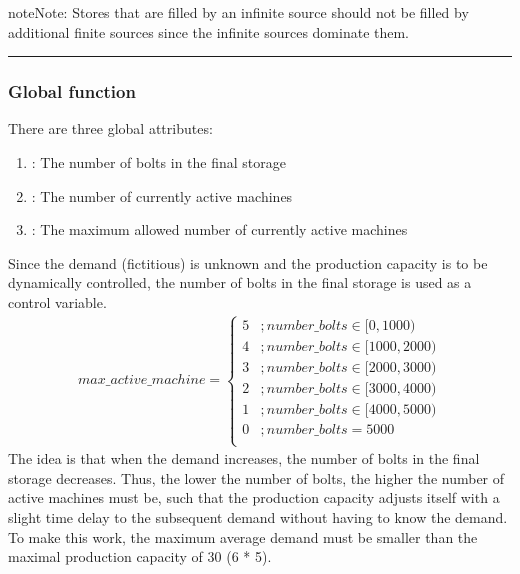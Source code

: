 \documentclass[letterpaper,10pt,english]{sphinxmanual}
\begin{document}
\begin{sphinxadmonition}{note}{Note:}
\sphinxAtStartPar
Stores that are filled by an infinite source should not be filled by additional finite sources since the infinite
sources dominate them.
\end{sphinxadmonition}


\bigskip\hrule\bigskip



\subsubsection{Global function}
\label{\detokenize{source/Examples/example03:global-function}}\label{\detokenize{source/Examples/example03:global1}}
\sphinxAtStartPar
There are three global attributes:
\begin{enumerate}
%
\item {} 
\sphinxAtStartPar
{}: The number of bolts in the final storage

\item {} 
\sphinxAtStartPar
{}: The number of currently active machines

\item {} 
\sphinxAtStartPar
{}: The maximum allowed number of currently active machines

\end{enumerate}

\sphinxAtStartPar
Since the demand (fictitious) is unknown and the production capacity is to be dynamically controlled, the number of
bolts in the final storage is used as a control variable.
\begin{equation*}
\begin{split}max\_active\_machine = \left\{\begin{array}{ll} 5 & ; number\_bolts \in \lbrack0,1000) \\
                     4 & ; number\_bolts \in \lbrack1000,2000) \\
         3 & ; number\_bolts \in \lbrack2000,3000) \\
         2 & ; number\_bolts \in \lbrack3000,4000) \\
         1 & ; number\_bolts \in \lbrack4000,5000) \\
         0 & ; number\_bolts = 5000\\
         \end{array}\right.\end{split}
\end{equation*}
\sphinxAtStartPar
The idea is that when the demand increases, the number of bolts in the final storage decreases. Thus, the lower the
number of bolts, the higher the number of active machines must be, such that the production capacity adjusts itself with
a slight time delay to the subsequent demand without having to know the demand. To make this work, the maximum average
demand must be smaller than the maximal production capacity of 30  (6 * 5).
\end{document}
